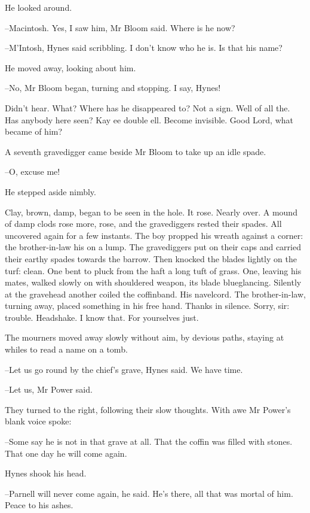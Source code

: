 He looked around.

--Macintosh.
Yes, I saw him, Mr Bloom said.
Where is he now?

--M'Intosh,
Hynes said scribbling.
I don't know who he is.
Is that his name?

He moved away, looking about him.

--No,
Mr Bloom began, turning and stopping.
I say, Hynes!

Didn't hear.
What?
Where has he disappeared to?
Not a sign.
Well of all the.
Has anybody here seen?
Kay ee double ell.
Become invisible.
Good Lord, what became of him?

A seventh gravedigger came beside Mr Bloom to take up an idle spade.

--O, excuse me!

He stepped aside nimbly.

Clay, brown, damp, began to be seen in the hole.
It rose.
Nearly over.
A mound of damp clods rose more, rose,
and the gravediggers rested their spades.
All uncovered again for a few instants.
The boy propped his wreath against a corner:
the brother-in-law his on a lump.
The gravediggers put on their caps and carried their earthy spades towards the barrow.
Then knocked the blades lightly on the turf:
clean.
One bent to pluck from the haft a long tuft of grass.
One, leaving his mates, walked slowly on with shouldered weapon,
its blade blueglancing.
Silently at the gravehead
another coiled the coffinband.
His navelcord.
The brother-in-law, turning away,
placed something in his free hand.
Thanks in silence.
Sorry, sir:
trouble.
Headshake.
I know that.
For yourselves just.

The mourners moved away slowly without aim, by devious paths,
staying at whiles to read a name on a tomb.

--Let us go round by the chief's grave,
Hynes said.
We have time.

--Let us,
Mr Power said.

They turned to the right, following their slow thoughts.
With awe Mr Power's blank voice spoke:

--Some say he is not in that grave at all.
That the coffin was filled with stones.
That one day he will come again.

Hynes shook his head.

--Parnell will never come again,
he said.
He's there, all that was mortal of him.
Peace to his ashes.

